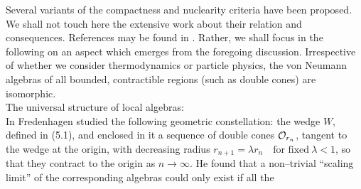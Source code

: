 Several variants of the compactness and nuclearity criteria have been
proposed. We shall not touch here the extensive work about their
relation and consequences. References may be found in
\cite{Ha}. Rather, we shall focus in the following 
on an aspect which emerges from the
foregoing discussion. Irrespective of whether we consider
thermodynamics or particle physics, the von Neumann algebras of all bounded,
contractible regions (such as double cones) are isomorphic. \\[2mm]
{\noindent \subsect The universal structure of local algebras:} \\[2mm]
In \cite{Fr} Fredenhagen 
studied the following geometric constellation: the wedge $W$,
defined in (5.1), and enclosed in it a sequence of double cones  ${\cal
  O}_{r_n}$, tangent to the wedge at the origin, with decreasing radius
$r_{n+1} = \lambda r_n \quad \mbox{for fixed} \ 
\lambda < 1$, so that they contract to the
origin as $n \to \infty$. He found that a non--trivial ``scaling limit''
of the corresponding algebras could only exist if all the 
